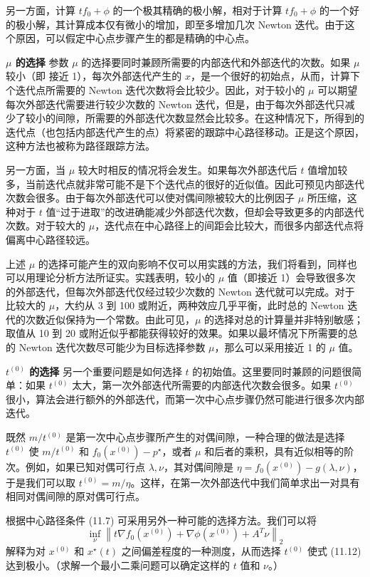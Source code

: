 \documentclass[UTF8, 12pt, fontset=fandol, oneside]{ctexart}
\begin{document}
另一方面，计算 $tf_0+\phi$ 的一个极其精确的极小解，相对于计算 $tf_0+\phi$ 的一个好的极小解，其计算成本仅有微小的增加，即至多增加几次 Newton 迭代。由于这个原因，可以假定中心点步骤产生的都是精确的中心点。

\noindent\textbf{$\mu$ 的选择}\quad
参数 $\mu$ 的选择要同时兼顾所需要的内部迭代和外部迭代的次数。如果 $\mu$ 较小（即
接近 1），每次外部迭代产生的 $x$，是一个很好的初始点，从而，计算下个迭代点所需要的 Newton 迭代次数将会比较少。因此，对于较小的 $\mu$ 可以期望每次外部迭代需要进行较少次数的 Newton 迭代，但是，由于每次外部迭代只减少了较小的间隙，所需要的外部迭代次数显然会比较多。在这种情况下，所得到的迭代点（也包括内部迭代产生的点）将紧密的跟踪中心路径移动。正是这个原因，这种方法也被称为路径跟踪方法。

另一方面，当 $\mu$ 较大时相反的情况将会发生。如果每次外部迭代后 $t$ 值增加较多，当前迭代点就非常可能不是下个迭代点的很好的近似值。因此可预见内部迭代次数会很多。由于每次外部迭代可以使对偶间隙被较大的比例因子 $\mu$ 所压缩，这种对于 $t$ 值``过于进取''的改进确能减少外部迭代次数，但却会导致更多的内部迭代次数。对于较大的 $\mu$，迭代点在中心路径上的间距会比较大，而很多内部迭代点将偏离中心路径较远。

上述 $\mu$ 的选择可能产生的双向影响不仅可以用实践的方法，我们将看到，同样也可以用理论分析方法所证实。实践表明，较小的 $\mu$ 值（即接近 1）会导致很多次的外部迭代，但每次外部迭代仅经过较少次数的 Newton 迭代就可以完成。对于比较大的 $\mu$，大约从 3 到 100 或附近，两种效应几乎平衡，此时总的 Newton 迭代的次数近似保持为一个常数。由此可见，$\mu$ 的选择对总的计算量并非特别敏感；取值从 10 到 20 或附近似乎都能获得较好的效果。如果以最坏情况下所需要的总的 Newton 迭代次数尽可能少为目标选择参数 $\mu$，那么可以采用接近 1 的 $\mu$ 值。

\noindent\textbf{$t^{(0)}$ 的选择}\quad
另一个重要问题是如何选择 $t$ 的初始值。这里要同时兼顾的问题很简单：如果 $t^{(0)}$ 太大，第一次外部迭代所需要的内部迭代次数会很多。如果 $t^{(0)}$ 很小，算法会进行额外的外部迭代，而第一次中心点步骤仍然可能进行很多次内部迭代。

既然 $m/t^{(0)}$ 是第一次中心点步骤所产生的对偶间隙，一种合理的做法是选择 $t^{(0)}$ 使 $m/t^{(0)}$ 和 $f_0(x^{(0)})-p^\star$，或者 $\mu$ 和后者的乘积，具有近似相等的阶次。例如，如果已知对偶可行点 $\lambda,\nu$，其对偶间隙是 $\eta=f_0(x^{(0)})-g(\lambda,\nu)$，于是我们可以取 $t^{(0)}=m/\eta$。这样，在第一次外部迭代中我们简单求出一对具有相同对偶间隙的原对偶可行点。

根据中心路径条件 (11.7) 可采用另外一种可能的选择方法。我们可以将
\begin{equation}
\inf_\nu\left\|t\nabla f_0(x^{(0)})+\nabla\phi(x^{(0)})+A^T\nu\right\|_2
\tag{11.12}
\end{equation}
解释为对 $x^{(0)}$ 和 $x^\star(t)$ 之间偏差程度的一种测度，从而选择 $t^{(0)}$ 使式 (11.12) 达到极小。（求解一个最小二乘问题可以确定这样的 $t$ 值和 $\nu$。）
\end{document}
